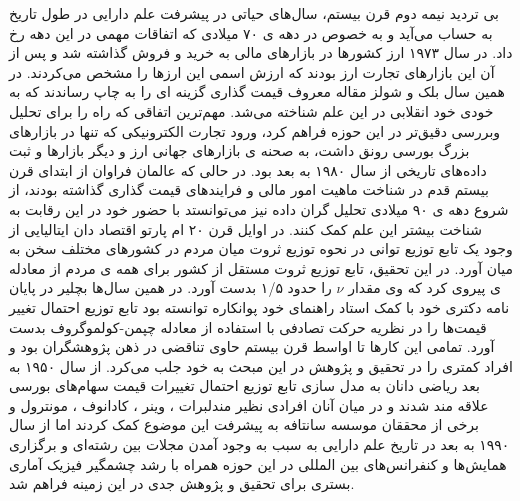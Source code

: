 \documentclass[a4paper,titlepage,12pt,fleqn,oneside]{report}
\begin{document}
	بی تردید نیمه دوم قرن بیستم، سال‌های حیاتی در پیشرفت علم دارایی در طول تاریخ به حساب می‌آید و به خصوص در دهه ی ۷۰ میلادی که اتفاقات مهمی در این دهه رخ داد. در سال ۱۹۷۳ ارز کشورها در بازارهای مالی به خرید و فروش گذاشته شد و پس از آن این بازارهای تجارت ارز بودند که ارزش اسمی این ارزها را مشخص می‌کردند. 
	در همین سال بلک و شولز مقاله معروف قیمت گذاری گزینه ای را به چاپ رساندند\cite{black} که به خودی خود انقلابی در این علم شناخته می‌شد. مهم‌ترین اتفاقی که راه را برای تحلیل وبررسی دقیق‌تر در این حوزه فراهم کرد، ورود تجارت الکترونیکی که تنها در بازارهای بزرگ بورسی رونق داشت، به صحنه ی بازارهای جهانی ارز و دیگر بازارها و ثبت داده‌های تاریخی از سال ۱۹۸۰ به بعد بود.  در حالی که عالمان فراوان از ابتدای قرن بیستم قدم در شناخت ماهیت امور مالی و فرایندهای قیمت گذاری گذاشته بودند، از شروع دهه ی ۹۰ میلادی تحلیل گران داده نیز می‌توانستد با حضور خود در این رقابت به شناخت بیشتر این علم کمک کنند. 
	در اوایل قرن ۲۰ ام پارتو اقتصاد دان ایتالیایی از وجود یک تابع توزیع 
	توانی در نحوه توزیع ثروت میان مردم در کشورهای مختلف سخن به میان آورد. در این تحقیق، تابع توزیع ثروت مستقل از کشور برای همه ی مردم از معادله ی   پیروی کرد که وی مقدار $\nu$ را حدود ۱/۵ بدست آورد. در همین سال‌ها بچلیر در پایان نامه دکتری خود\cite{bac} با کمک استاد راهنمای خود پوانکاره توانسته بود تابع توزیع احتمال تغییر قیمت‌ها را  در نظریه حرکت تصادفی با استفاده از معادله چپمن-کولموگروف بدست آورد. تمامی این کارها تا اواسط قرن بیستم حاوی تناقضی در ذهن پژوهشگران بود و افراد کمتری را در تحقیق و پژوهش در این مبحث به خود جلب می‌کرد. از سال ۱۹۵۰ به بعد ریاضی دانان به مدل سازی تابع توزیع احتمال تغییرات قیمت سهام‌های بورسی علاقه مند شدند و در میان آنان افرادی نظیر مندلبرات \cite{mandel}، وینر ، کادانوف \cite{kada}، مونترول  \cite{mont} و برخی از محققان موسسه سانتافه\cite{santa}  به پیشرفت این موضوع کمک کردند اما از سال ۱۹۹۰ به بعد در تاریخ علم دارایی به سبب به وجود آمدن مجلات بین رشته‌ای و برگزاری همایش‌ها و کنفرانس‌های بین المللی در این حوزه همراه با رشد چشمگیر فیزیک آماری بستری برای تحقیق و پژوهش جدی در این زمینه فراهم شد.  
	
	
	
\end{document}
